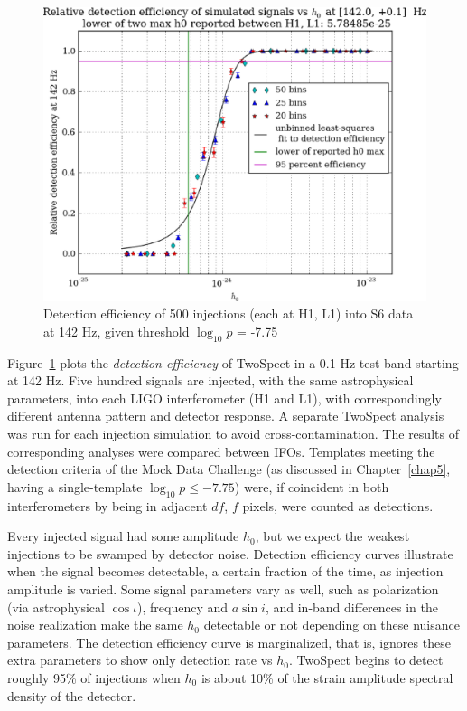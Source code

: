 \begin{figure}
\begin{center}
\includegraphics[width=0.5\paperwidth,height=0.35\paperheight]{plots/detectionEfficiencyh0-142-0Hz.eps}
\caption{Detection efficiency of 500 injections (each at H1, L1) into
S6 data at 142 Hz, given threshold $\log_{10}p$ = -7.75}
\label{S6_det_eff_142}
\end{center}
\end{figure}

Figure~\ref{S6_det_eff_142} plots the \textit{detection efficiency} of TwoSpect in a 0.1 Hz test band starting at 142 Hz.
Five hundred signals are injected, with the same astrophysical parameters, into each LIGO interferometer (H1 and L1), with correspondingly different antenna pattern and detector response.
A separate TwoSpect analysis was run for each injection simulation to avoid cross-contamination.
The results of corresponding analyses were compared between IFOs.
Templates meeting the detection criteria of the Mock Data Challenge (as discussed in Chapter~\ref{chap5}, having a single-template $\log_{10} p \leq -7.75$) were, if coincident in both interferometers by being in adjacent $df$, $f$ pixels, were counted as detections.

Every injected signal had some amplitude $h_0$, but we expect the weakest injections to be swamped by detector noise.
Detection efficiency curves illustrate when the signal becomes detectable, a certain fraction of the time, as injection amplitude is varied.
Some signal parameters vary as well, such as polarization (via astrophysical $\cos \iota$), frequency and $a \sin i$, and in-band differences in the noise realization make the same $h_0$ detectable or not depending on these nuisance parameters.
The detection efficiency curve is marginalized, that is, ignores these extra parameters to show only detection rate vs $h_0$.
TwoSpect begins to detect roughly 95\% of injections when $h_0$ is about 10\% of the strain amplitude spectral density of the detector.

